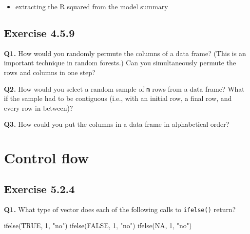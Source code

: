 \documentclass[
]{book}
\newenvironment{Shaded}{\begin{snugshade}}{\end{snugshade}}
\newcommand{\CommentTok}[1]{\textcolor[rgb]{0.56,0.35,0.01}{\textit{#1}}}
\newcommand{\ConstantTok}[1]{\textcolor[rgb]{0.00,0.00,0.00}{#1}}
\newcommand{\DecValTok}[1]{\textcolor[rgb]{0.00,0.00,0.81}{#1}}
\newcommand{\FunctionTok}[1]{\textcolor[rgb]{0.00,0.00,0.00}{#1}}
\newcommand{\NormalTok}[1]{#1}
\newcommand{\SpecialCharTok}[1]{\textcolor[rgb]{0.00,0.00,0.00}{#1}}
\newcommand{\StringTok}[1]{\textcolor[rgb]{0.31,0.60,0.02}{#1}}
\providecommand{\tightlist}{%
  \setlength{\itemsep}{0pt}\setlength{\parskip}{0pt}}
\begin{document}
\begin{itemize}
\tightlist
\item
  extracting the R squared from the model summary
\end{itemize}

\begin{Shaded}
\end{Shaded}

\hypertarget{exercise-4.5.9}{%
\section{Exercise 4.5.9}\label{exercise-4.5.9}}

\textbf{Q1.} How would you randomly permute the columns of a data frame? (This is an important technique in random forests.) Can you simultaneously permute the rows and columns in one step?

\textbf{Q2.} How would you select a random sample of \texttt{m} rows from a data frame? What if the sample had to be contiguous (i.e., with an initial row, a final row, and every row in between)?

\textbf{Q3.} How could you put the columns in a data frame in alphabetical order?

\hypertarget{control-flow}{%
\chapter{Control flow}\label{control-flow}}

\hypertarget{exercise-5.2.4}{%
\section{Exercise 5.2.4}\label{exercise-5.2.4}}

\textbf{Q1.} What type of vector does each of the following calls to \texttt{ifelse()} return?

\begin{Shaded}
\begin{Highlighting}[]
\FunctionTok{ifelse}\NormalTok{(}\ConstantTok{TRUE}\NormalTok{, }\DecValTok{1}\NormalTok{, }\StringTok{"no"}\NormalTok{)}
\FunctionTok{ifelse}\NormalTok{(}\ConstantTok{FALSE}\NormalTok{, }\DecValTok{1}\NormalTok{, }\StringTok{"no"}\NormalTok{)}
\FunctionTok{ifelse}\NormalTok{(}\ConstantTok{NA}\NormalTok{, }\DecValTok{1}\NormalTok{, }\StringTok{"no"}\NormalTok{)}
\end{Highlighting}
\end{Shaded}
\end{document}
